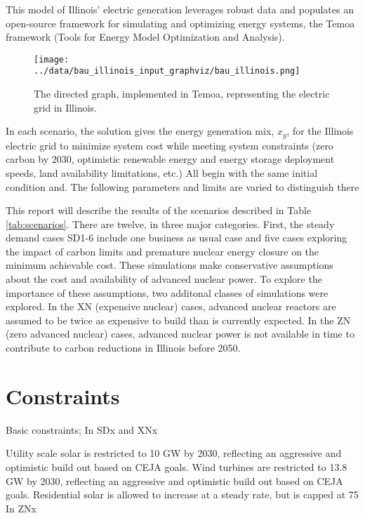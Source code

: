 This model of Illinois' electric generation leverages robust data and populates 
an open-source framework for simulating and optimizing energy systems, 
the Temoa framework (Tools for Energy Model Optimization and Analysis). 


\begin{wrapfigure}{l}{0.3\linewidth}
\begin{center}
\texttt{[image: ../data/bau\_illinois\_input\_graphviz/bau\_illinois.png]}
\end{center}
\caption{The directed graph, implemented in Temoa, representing the electric grid in Illinois.}
\label{fig:temoa_graph}
\end{wrapfigure}

In each scenario, the solution gives the energy generation mix, $x_g$,
for the Illinois electric grid to minimize system cost while meeting system
constraints (zero carbon by 2030, optimistic renewable energy and energy
storage deployment speeds, land availability limitations, etc.)
All begin with the same initial condition and. The following parameters and limits are varied to distinguish there

This report will describe the results of the scenarios described in Table \ref{tab:scenarios}. 
There are twelve, in three major categories. First, the steady demand cases SD1-6 include one business as usual case and five cases exploring the impact of carbon limits and premature nuclear energy closure on the minimum achievable cost. These simulations make conservative assumptions about the cost and availability of advanced nuclear power. To explore the importance of these assumptions, two additonal classes of simulations were explored. In the XN (expensive nuclear) cases, advanced nuclear reactors are assumed to be twice as expensive to build than is currently expected. In the ZN (zero advanced nuclear) cases, advanced nuclear power is not available in time to contribute to carbon reductions in Illinois before 2050.  

\section{Constraints}
Basic constraints;
In SDx and XNx

Utility scale solar is restricted to 10 GW by 2030, reflecting an aggressive and optimistic build out based on CEJA goals.
Wind turbines are restricted to 13.8 GW by 2030, reflecting an aggressive and optimistic build out based on CEJA goals.
Residential solar is allowed to increase at a steady rate, but is capped at 75%
In ZNx

